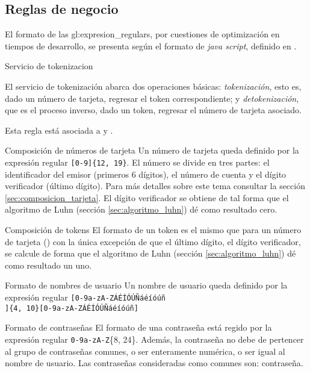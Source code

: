 %
%

\subsection{Reglas de negocio}

El formato de las \glspl{gl:expresion_regular}, por cuestiones de optimización
en tiempos de desarrollo, se presenta según el formato de \textit{java script},
definido en \cite{mozilla_er}.

{Servicio de tokenizacion}
{
  El servicio de tokenización abarca dos operaciones básicas:
  \textit{tokenización}, esto es, dado un número de tarjeta, regresar el token
  correspondiente; y \textit{detokenización}, que es el proceso inverso, dado un
  token, regresar el número de tarjeta asociado.

  Esta regla está asociada a  y
  .
}

{Composición de números de tarjeta}
{
  Un número de tarjeta queda definido por la expresión regular
  \texttt{[0-9]\{12, 19\}}. El número se divide en tres partes: el
  identificador del emisor (primeros 6 dígitos), el número de cuenta y el dígito
  verificador (último dígito). Para más detalles sobre este tema consultar la
  sección \ref{sec:composicion_tarjeta}. El dígito verificador se obtiene de tal
  forma que el algoritmo de Luhn (sección \ref{sec:algoritmo_luhn}) dé como
  resultado cero.
}

{Composición de tokens}
{
  El formato de un token es el mismo que para un número de tarjeta
  () con la única excepción de que el
  último dígito, el dígito verificador, se calcule de forma que el algoritmo de
  Luhn (sección \ref{sec:algoritmo_luhn}) dé como resultado un uno.
}


{Formato de nombres de usuario}
{
  Un nombre de usuario queda definido por la expresión regular
  \texttt{[0-9a-zA-ZÁÉÍÓÚÑáéíóúñ\\ ]\{4, 10\}[0-9a-zA-ZÁÉÍÓÚÑáéíóúñ]}
}


{Formato de contraseñas}
{
  El formato de una contraseña está regido por la expresión regular
  \texttt{0-9a-zA-Z}\{8, 24\}. Además, la contraseña no debe de pertencer al
  grupo de contraseñas comunes, o ser enteramente numérica, o ser igual al
  nombre de usuario. Las contraseñas consideradas como comunes son: contraseña.
}
